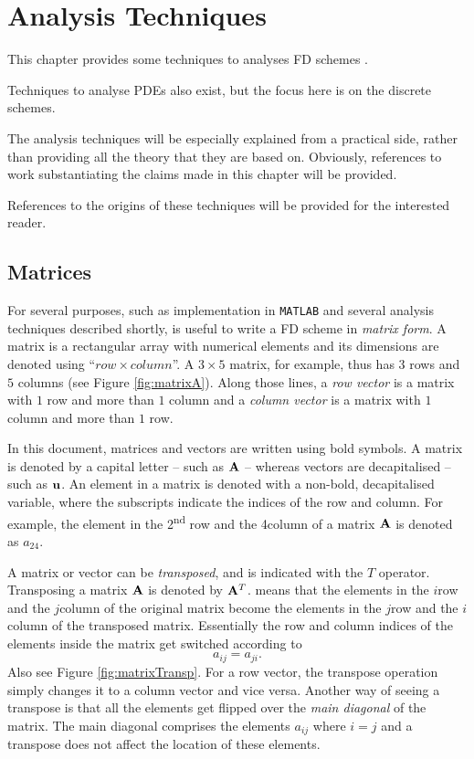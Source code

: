 \chapter{Analysis Techniques}\label{ch:analysis}

This chapter provides some techniques to analyses FD schemes .

Techniques to analyse PDEs also exist, but the focus here is on the discrete schemes.

The analysis techniques will be especially explained from a practical side, rather than providing all the theory that they are based on. Obviously, references to work substantiating the claims made in this chapter will be provided. 

References to the origins of these techniques will be provided for the interested reader. 

\section{Matrices}
For several purposes, such as implementation in \texttt{MATLAB} and several analysis techniques described shortly, is useful to write a FD scheme in \textit{matrix form}. A matrix is a rectangular array with numerical elements and its dimensions are denoted using ``$row \times column$''. A $3\times 5$ matrix, for example, thus has $3$ rows and $5$ columns (see Figure \ref{fig:matrixA}). Along those lines, a \textit{row vector} is a matrix with $1$ row and more than $1$ column and a \textit{column vector} is a matrix with $1$ column and more than $1$ row.  

In this document, matrices and vectors are written using bold symbols.  A matrix is denoted by a capital letter -- such as $\mathbf{A}$ -- whereas vectors are decapitalised -- such as $\mathbf{u}$. An element in a matrix is denoted with a non-bold, decapitalised variable, where the subscripts indicate the indices of the row and column. For example, the element in the 2\textsuperscript{nd} row and the 4\th column of a matrix $\mathbf{A}$ is denoted as $a_{24}$.

A matrix or vector can be \textit{transposed}, and is indicated with the $T$ operator. Transposing a matrix $\mathbf{A}$ is denoted by $\mathbf{A}^T$.  means that the elements in the $i$\th row and the $j$\th column of the original matrix become the elements in the $j$\th row and the $i$\th column of the transposed matrix. Essentially the row and column indices of the elements inside the matrix get switched according to
\begin{equation}\label{eq:matrixTransposition}
    a_{ij} = a_{ji}.
\end{equation} 
Also see Figure \ref{fig:matrixTransp}. For a row vector, the transpose operation simply changes it to a column vector and vice versa. Another way of seeing a transpose is that all the elements get flipped over the \textit{main diagonal} of the matrix. The main diagonal comprises the elements $a_{ij}$ where $i=j$ and a transpose does not affect the location of these elements. 

